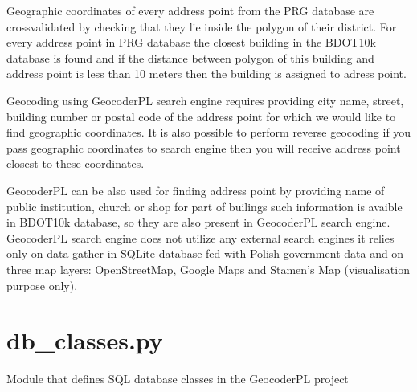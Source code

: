 \documentclass[letterpaper,10pt,english]{sphinxmanual}
\begin{document}
\sphinxAtStartPar
Geographic coordinates of every address point from the PRG database are cross\sphinxhyphen{}validated by checking that they lie inside the polygon of their district. For every address point in PRG database the closest building in the BDOT10k database is found and if the distance between polygon of this building and address point is less than 10 meters then the building is assigned to adress point.

\sphinxAtStartPar
Geocoding using GeocoderPL search engine requires providing city name, street, building number or postal code of the address point for which we would like to find geographic coordinates. It is also possible to perform reverse geocoding \sphinxhyphen{} if you pass geographic coordinates to search engine then you will receive address point closest to these coordinates.

\sphinxAtStartPar
GeocoderPL can be also used for finding address point by providing name of public institution, church or shop \sphinxhyphen{} for part of builings such information is avaible in BDOT10k database, so they are also present in GeocoderPL search engine. GeocoderPL search engine does not utilize any external search engines \sphinxhyphen{} it relies only on data gather in SQLite database fed with Polish government data and on three map layers: OpenStreetMap, Google Maps and Stamen’s Map (visualisation purpose only).

\sphinxstepscope


\chapter{db\_classes.py}
\label{\detokenize{db_classes:module-db_classes}}\label{\detokenize{db_classes:db-classes-py}}\label{\detokenize{db_classes::doc}}
\sphinxAtStartPar
Module that defines SQL database classes in the GeocoderPL project
\end{document}
